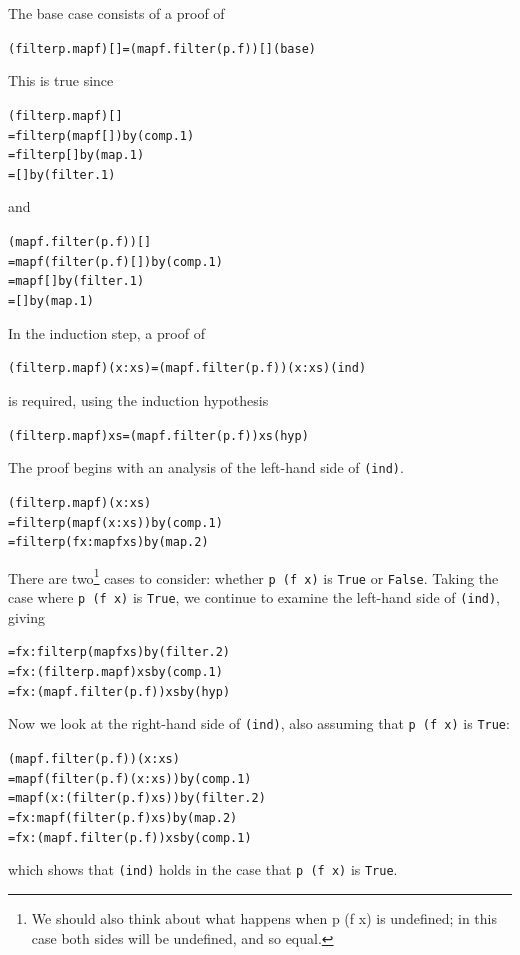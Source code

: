The base case consists of a proof of 
\begin{alltt}
(filter p . map f) [] = (map f . filter (p . f)) [] \hfill (base)
\end{alltt}
This is true since
\begin{alltt}
(filter p . map f) []
  = filter p (map f []) \hfill {\rm by} (comp.1)
  = filter p [] \hfill {\rm by} (map.1)
  = [] \hfill {\rm by} (filter.1)
\end{alltt}
and
\begin{alltt}
(map f . filter (p . f)) []
  = map f (filter (p . f) [])  \hfill {\rm by} (comp.1)
  = map f []  \hfill {\rm by} (filter.1)
  = []  \hfill {\rm by} (map.1)
\end{alltt}
In the induction step, a proof of 
\begin{alltt}
(filter p . map f) (x:xs) = (map f . filter (p . f)) (x:xs) \hfill (ind)
\end{alltt}
is required, using the induction hypothesis
\begin{alltt}
(filter p . map f) xs = (map f . filter (p . f)) xs \hfill (hyp)
\end{alltt}
The proof begins with an analysis of the left-hand side of \texttt{(ind)}.
\begin{alltt}
(filter p . map f) (x:xs)
  = filter p (map f (x:xs))  \hfill {\rm by} (comp.1)
  = filter p (f x : map f xs) \hfill {\rm by} (map.2)
\end{alltt}
There are two\footnote{
We should also think about what happens when {\smtt p (f x)} is undefined; in
this case both sides will be undefined, and so equal.}
cases to consider:
whether \texttt{p (f x)} is \texttt{True} or \texttt{False}. Taking the case
where  \texttt{p (f x)} is \texttt{True}, we continue to examine the left-hand
side of \texttt{(ind)}, giving
\begin{alltt}
  = f x : filter p (map f xs)  \hfill {\rm by} (filter.2)
  = f x : (filter p . map f) xs \hfill {\rm by} (comp.1)
  = f x : (map f . filter (p . f)) xs \hfill {\rm by} (hyp)
\end{alltt}
Now we look at the right-hand side of \texttt{(ind)}, also assuming 
that \texttt{p (f x)} is \texttt{True}:
\begin{alltt}
(map f . filter (p . f)) (x:xs) 
  = map f (filter (p . f) (x:xs))\hfill {\rm by} (comp.1) 
  = map f (x: (filter (p . f) xs))\hfill {\rm by} (filter.2) 
  = f x : map f (filter (p . f) xs)\hfill {\rm by} (map.2)
  = f x : (map f . filter (p . f)) xs \hfill {\rm by} (comp.1)
\end{alltt}
which shows that \texttt{(ind)} holds in the case that \texttt{p (f
x)} is \texttt{True}.

